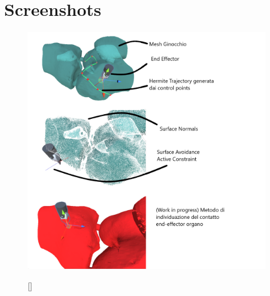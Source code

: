 \documentclass{article}
\begin{document}
\newpage
\section*{Screenshots}
\begin{figure}[h!]
    \begin{small}
        \begin{center}
            \includegraphics[width=0.95\textwidth]{Scene.png}
        \end{center}[]
        \label{fig:}
    \end{small}
\end{figure}

    
\end{document}
